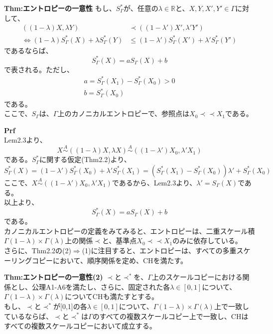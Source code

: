 \documentclass[a4paper,11pt]{jsarticle}
\begin{document}
\begin{itembox}[l]{\textbf{Thm:エントロピーの一意性}}
もし、$S_{\Gamma}^*$が、任意の$\lambda \in \mathbb{R}$と、$X,Y,X',Y' \in \Gamma $に対して、
\begin{align}
    ((1-\lambda)X,\lambda Y) &\prec ((1-\lambda')X',\lambda' Y') \\
    \Leftrightarrow (1-\lambda)S_{\Gamma}^*(X)+\lambda S_{\Gamma}^*(Y) &\leq (1-\lambda')S_{\Gamma}^*(X')+\lambda' S_{\Gamma}^*(Y')
\end{align}
であるならば、
\begin{equation}
    S_{\Gamma}^*(X)=aS_{\Gamma} (X)+b
\end{equation}
で表される。ただし、
\begin{align}
    a = S_{\Gamma}^*(X_1)-S_{\Gamma}^*(X_0)>0\\
    b = S_{\Gamma}^*(X_0)
\end{align}
である。\\
ここで、$S_{\Gamma}$は、$\Gamma$上のカノニカルエントロピーで、参照点は$X_0 \prec \prec X_1$である。
\end{itembox}
\textbf{Prf}\\
Lem2.3より、
\begin{equation}
    X \overset{A}{\sim} ((1-\lambda)X,\lambda X) \overset{A}{\sim} ((1-\lambda')X_0,\lambda' X_1)
\end{equation}
である。$S_{\Gamma}^*$に関する仮定(Thm2.2)より、
\begin{equation}
    S_{\Gamma}^*(X) = (1-\lambda')S_{\Gamma}^*(X_0)+\lambda' S_{\Gamma}^*(X_1)=(S_{\Gamma}^*(X_1)-S_{\Gamma}^*(X_0))\lambda'+S_{\Gamma}^*(X_0)
\end{equation}
ここで、$X \overset{A}{\sim} ((1-\lambda')X_0,\lambda' X_1)$であるから、Lem2.3より、$\lambda ' = S_{\Gamma}(X)$である。\\
以上より、
\begin{equation}
    S_{\Gamma}^*(X) = aS_{\Gamma}(X)+b
\end{equation}
である。\hfill\qedsymbol\\

カノニカルエントロピーの定義をみてみると、エントロピーは、二重スケール積$\Gamma(1-\lambda)\times \Gamma(\lambda)$上の関係$\prec$と、基準点$X_0 \prec \prec X_1$のみに依存している。\\
さらに、Thm2.2の(2)$ \Rightarrow $(1)に注目すると、エントロピーは、すべての多重スケーリングコピーにおいて、順序関係を定め、CHを満たす。\\

\begin{itembox}[l]{\textbf{Thm:エントロピーの一意性(2)}}
    $\prec$と$\prec ^*$を、$\Gamma$上のスケールコピーにおける関係とし、公理A1-A6を満たし、さらに、固定された各$\lambda \in [0,1]$について、$\Gamma(1-\lambda)\times \Gamma(\lambda)$についてCHも満たすとする。\\
    もし、$\prec$と$\prec ^*$が[0,1]の各$\lambda\in [0,1]$について、$\Gamma(1-\lambda)\times \Gamma(\lambda)$上で一致しているならば、$\prec$と$\prec ^*$は$\Gamma$のすべての複数スケールコピー上で一致し、CHはすべての複数スケールコピーにおいて成立する。
\end{itembox}
\end{document}

